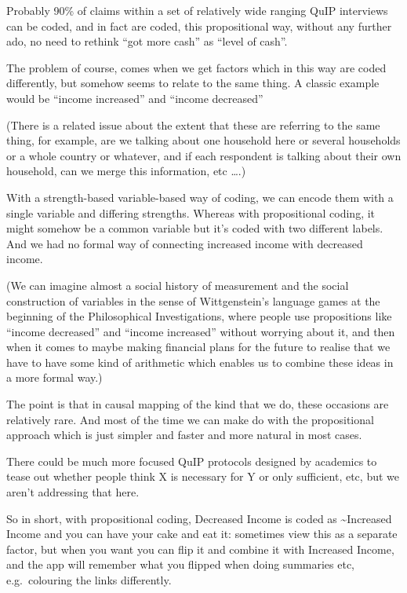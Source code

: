\documentclass[
]{book}
\begin{document}
Probably 90\% of claims within a set of relatively wide ranging QuIP interviews can be coded, and in fact are coded, this propositional way, without any further ado, no need to rethink ``got more cash'' as ``level of cash''.

The problem of course, comes when we get factors which in this way are coded differently, but somehow seems to relate to the same thing. A classic example would be ``income increased'' and ``income decreased''

(There is a related issue about the extent that these are referring to the same thing, for example, are we talking about one household here or several households or a whole country or whatever, and if each respondent is talking about their own household, can we merge this information, etc \ldots.)

With a strength-based variable-based way of coding, we can encode them with a single variable and differing strengths.
Whereas with propositional coding, it might somehow be a common variable but it's coded with two different labels. And we had no formal way of connecting increased income with decreased income.

(We can imagine almost a social history of measurement and the social construction of variables in the sense of Wittgenstein's
language games at the beginning of the Philosophical Investigations, where people use propositions like ``income decreased'' and ``income increased'' without worrying about it, and then when it comes to maybe making financial plans for the future to realise that we have to have some kind of arithmetic which enables us to combine these ideas in a more formal way.)

The point is that in causal mapping of the kind that we do, these occasions are relatively rare. And most of the time we can make do with the propositional approach which is just simpler and faster and more natural in most cases.

There could be much more focused QuIP protocols designed by academics to tease out whether people think X is necessary for Y or only sufficient, etc, but we aren't addressing that here.

So in short, with propositional coding, Decreased Income is coded as \textasciitilde Increased Income and you can have your cake and eat it: sometimes view this as a separate factor, but when you want you can flip it and combine it with Increased Income, and the app will remember what you flipped when doing summaries etc, e.g.~colouring the links differently.
\end{document}
